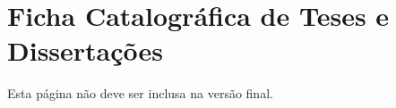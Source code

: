 \thispagestyle{empty}
{
    
}

\clearpage{}

\thispagestyle{empty}
\hphantom{.}
\vfill

\section*{Ficha Catalográfica de Teses e Dissertações}

Esta página não deve ser inclusa na versão final.
\clearpage{}

\thispagestyle{empty}
{
    
}